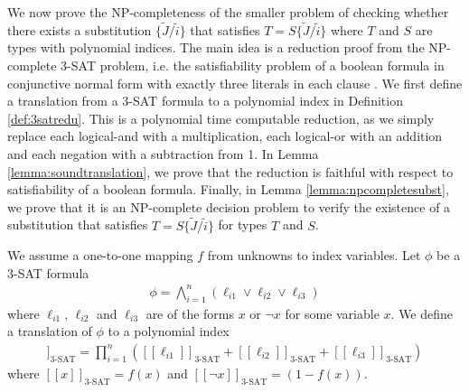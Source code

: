 We now prove the NP-completeness of the smaller problem of checking whether there exists a substitution $\{\widetilde{J}/\widetilde{i}\}$ that satisfies $T = S\{\widetilde{J}/\widetilde{i}\}$ where $T$ and $S$ are types with polynomial indices. The main idea is a reduction proof from the NP-complete 3-SAT problem, i.e. the satisfiability problem of a boolean formula in conjunctive normal form with exactly three literals in each clause \cite{Karp1972}. We first define a translation from a 3-SAT formula to a polynomial index in Definition \ref{def:3satredu}. This is a polynomial time computable reduction, as we simply replace each logical-and with a multiplication, each logical-or with an addition and each negation with a subtraction from 1. In Lemma \ref{lemma:soundtranslation}, we prove that the reduction is faithful with respect to satisfiability of a boolean formula. Finally, in Lemma \ref{lemma:npcompletesubst}, we prove that it is an NP-complete decision problem to verify the existence of a substitution that satisfies $T = S\{\widetilde{J}/\widetilde{i}\}$ for types $T$ and $S$.
%
\begin{definition}\label{def:3satredu}
We assume a one-to-one mapping $f$ from unknowns to index variables. Let $\phi$ be a 3-SAT formula
\begin{align*}
    \phi = \bigwedge_{i=1}^n \left(\ell_{i1} \lor \ell_{i2} \lor \ell_{i3}\right)%
\end{align*}
where $\ell_{i1}$, $\ell_{i2}$ and $\ell_{i3}$ are of the forms $x$ or $\neg x$ for some variable $x$. We define a translation of $\phi$ to a polynomial index %
\begin{align*}
    [\![\phi]\!]_{\text{3-SAT}} = \prod_{i=1}^n \left([\![\ell_{i1}]\!]_{\text{3-SAT}} + [\![\ell_{i2}]\!]_{\text{3-SAT}} + [\![\ell_{i3}]\!]_{\text{3-SAT}}\right) %
\end{align*}
where $[\![x]\!]_{\text{3-SAT}} = f(x)$ and $[\![\neg x]\!]_{\text{3-SAT}} = (1 - f(x))$.
\end{definition}


